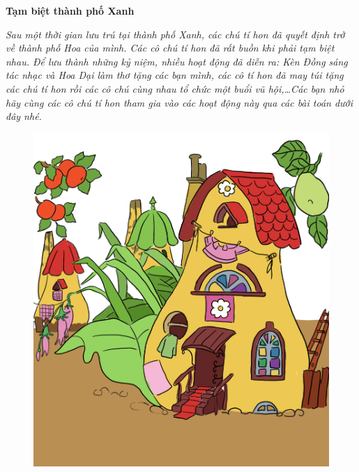 	\centerline{\textbf{\color{toancuabi}Tạm biệt thành phố Xanh}}
	\vskip 0.1cm
	\begin{multicols}{2}
		\textit{Sau một thời gian lưu trú tại thành phố Xanh, các chú tí hon đã quyết định trở về thành phố Hoa của mình. Các cô chú tí hon đã rất buồn khi phải tạm biệt nhau. Để lưu thành những kỷ niệm, nhiều hoạt động đã diễn ra: Kèn Đồng sáng tác nhạc và Hoa Dại làm thơ tặng các bạn mình, các cô tí hon đã may túi tặng các chú tí hon rồi các cô chú cùng nhau tổ chức một buổi vũ hội,\ldots Các bạn nhỏ hãy cùng các cô chú tí hon tham gia vào các hoạt động này qua các bài toán dưới đây nhé.}
		\begin{figure}[H]
			\centering
			\vspace*{-5pt}
			\captionsetup{labelformat= empty, justification=centering}
			\includegraphics[width=1\linewidth]{Hinh10_ThanhPhoXanh}
			\vspace*{-10pt}
		\end{figure}
	\end{multicols}
	\vskip 0.1cm
